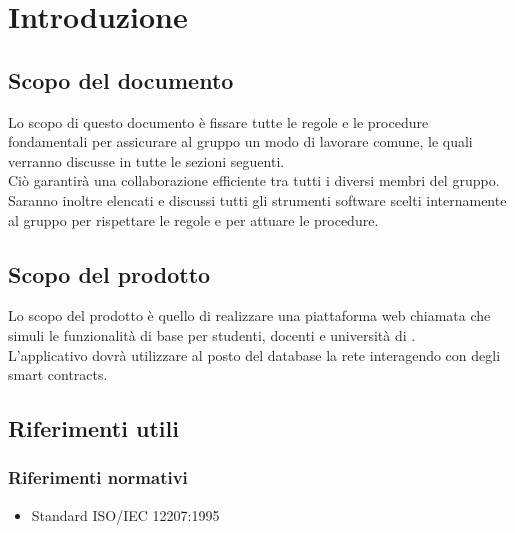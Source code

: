 \documentclass[NormeDiProgetto.tex]{subfiles}
\begin{document}
\chapter{Introduzione}

\section{Scopo del documento}
Lo scopo di questo documento è fissare tutte le regole e le procedure fondamentali per assicurare al gruppo un modo di lavorare comune, le quali verranno discusse in tutte le sezioni seguenti.\\
Ciò garantirà una collaborazione efficiente tra tutti i diversi membri del gruppo.\\
Saranno inoltre elencati e discussi tutti gli strumenti software scelti internamente al gruppo per rispettare le regole e per attuare le procedure.

\section{Scopo del prodotto}
Lo scopo del prodotto è quello di realizzare una piattaforma web chiamata \progetto{} che simuli le funzionalità di base per studenti, docenti e università di .\\
L'applicativo dovrà utilizzare al posto del database la rete  interagendo con degli smart contracts.

\glossExpl

\section{Riferimenti utili}
\subsection{Riferimenti normativi}
\begin{itemize}
	\item Standard ISO/IEC 12207:1995\\ 
\end{itemize}
\end{document}
